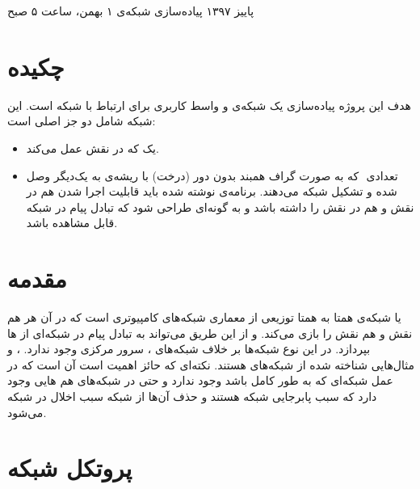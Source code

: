 \documentclass{article}
\begin{document}
    \handout
    {}
    {}
    {پاییز ۱۳۹۷}
    {پیاده‌سازی شبکه‌ی }
    {۱ بهمن، ساعت ۵ صبح}
    
    \vspace{0.3cm}
     
\section{چکیده}

   هدف این پروژه پیاده‌سازی یک شبکه‌ی  و واسط کاربری برای ارتباط با شبکه است.  این شبکه شامل دو جز اصلی است: 

\begin{itemize}
   \item   	یک  که در نقش  عمل می‌کند.

\item تعدادی ‌ که به صورت گراف همبند بدون دور (درخت) با ریشه‌ی  به یک‌دیگر وصل شده و تشکیل شبکه می‌دهند.
   برنامه‌ی نوشته شده باید قابلیت اجرا شدن هم در نقش  و هم در نقش  را داشته باشد و به گونه‌ای طراحی شود که تبادل پیام در شبکه قابل مشاهده باشد.
\end{itemize}
 



\section{مقدمه}
 یا شبکه‌ی همتا به همتا توزیعی از معماری شبکه‌های کامپیوتری است که در آن هر  هم نقش  و هم نقش  را بازی می‌کند. و از این طریق می‌تواند به تبادل پیام در شبکه‌ای از ها بپردازد. در این نوع شبکه‌ها بر خلاف شبکه‌های ، سرور مرکزی وجود ندارد. ،  و  مثال‌هایی شناخته شده از شبکه‌های  هستند. نکته‌ای که حائز اهمیت است آن است که در عمل شبکه‌ای که به طور کامل  باشد وجود ندارد و حتی در شبکه‌های  هم هایی وجود دارد که سبب پابرجایی شبکه هستند و حذف آن‌ها از شبکه سبب اخلال در شبکه می‌شود.



\section{پروتکل شبکه}
\end{document}
